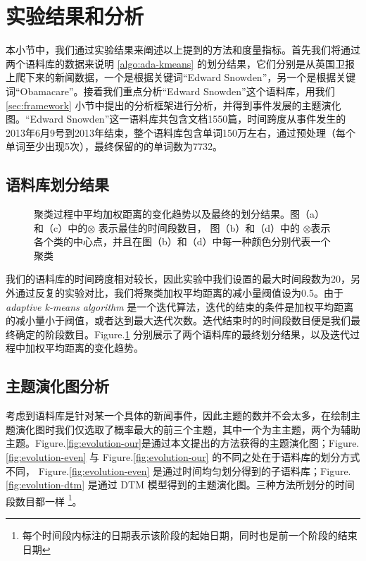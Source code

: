 \section{实验结果和分析}
本小节中，我们通过实验结果来阐述以上提到的方法和度量指标。首先我们将通过两个语料库的数据来说明 \ref{algo:ada-kmeans} 的划分结果，它们分别是从英国卫报上爬下来的新闻数据，一个是根据关键词“Edward Snowden”，另一个是根据关键词“Obamacare”。接着我们重点分析“Edward Snowden”这个语料库，用我们 \ref{sec:framework} 小节中提出的分析框架进行分析，并得到事件发展的主题演化图。“Edward Snowden”这一语料库共包含文档1550篇，时间跨度从事件发生的2013年6月9号到2013年结束，整个语料库包含单词150万左右，通过预处理（每个单词至少出现5次），最终保留的的单词数为7732。
\subsection{语料库划分结果}
\label{sec:ada-kmeans-result}
\begin{figure}[!htb]
	\caption{聚类过程中平均加权距离的变化趋势以及最终的划分结果。图（a）和（c）中的$\otimes$ 表示最佳的时间段数目， 图（b）和（d）中的 $\otimes$表示各个类的中心点，并且在图（b）和（d）中每一种颜色分别代表一个聚类}
	\label{fig:cluster}
\end{figure}
我们的语料库的时间跨度相对较长，因此实验中我们设置的最大时间段数为20，另外通过反复的实验对比，我们将聚类加权平均距离的减小量阀值设为0.5。由于 \emph{adaptive k-means algorithm} 是一个迭代算法，迭代的结束的条件是加权平均距离的减小量小于阀值，或者达到最大迭代次数。迭代结束时的时间段数目便是我们最终确定的阶段数目。Figure.\ref{fig:cluster} 分别展示了两个语料库的最终划分结果，以及迭代过程中加权平均距离的变化趋势。

\subsection{主题演化图分析}
\label{sec:evolution-map}
考虑到语料库是针对某一个具体的新闻事件，因此主题的数并不会太多，在绘制主题演化图时我们仅选取了概率最大的前三个主题，其中一个为主主题，两个为辅助主题。Figure.\ref{fig:evolution-our}是通过本文提出的方法获得的主题演化图；Figure.\ref{fig:evolution-even} 与 Figure.\ref{fig:evolution-our} 的不同之处在于语料库的划分方式不同， Figure.\ref{fig:evolution-even}  是通过时间均匀划分得到的子语料库；Figure.\ref{fig:evolution-dtm} 是通过 DTM 模型得到的主题演化图。三种方法所划分的时间段数目都一样 \footnote{每个时间段内标注的日期表示该阶段的起始日期，同时也是前一个阶段的结束日期}。

